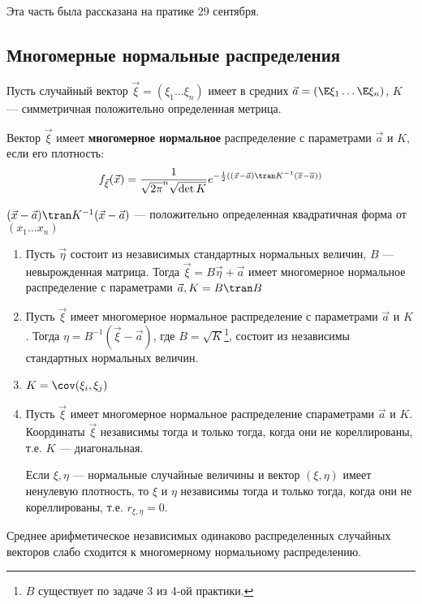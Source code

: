 \begin{remark}
    Эта часть была рассказана на пратике 29 сентября.
\end{remark}

\subsection{Многомерные нормальные распределения}

\begin{definition}
    Пусть случайный вектор \(\vec{\xi} = (\xi_1 \dots \xi_n)\) имеет в средних \(\vec{a} = (\E \xi_1 \dots \E \xi_n)\), \(K\) --- симметричная положительно определенная метрица.

    Вектор \(\vec{\xi}\) имеет \textbf{многомерное нормальное} распределение с параметрами \(\vec{a}\) и \(K\), если его плотность:
    \[f_{ \vec{\xi}}(\vec{x}) = \frac{1}{\sqrt{2 \pi}^n \sqrt{\det K}} e^{ - \frac{1}{2} ((\vec{x} - \vec{a})\tran K^{-1} (\overline{x} - \overline{a}))}\]
\end{definition}
\begin{remark}
    \((\vec{x} - \vec{a})\tran K^{-1} (\vec{x} - \vec{a})\) --- положительно определенная квадратичная форма от \((x_1 \dots x_n)\)
\end{remark}

\begin{prop}\itemfix
    \begin{enumerate}
        \item Пусть \(\vec{\eta}\) состоит из независимых стандартных нормальных величин, \(B\) --- невырожденная матрица. Тогда \(\vec{\xi} = B \vec{\eta} + \vec{a}\) имеет многомерное нормальное распределение с параметрами \(\vec{a}, K = B\tran B\)
        \item Пусть \(\vec{\xi}\) имеет многомерное нормальное распределение с параметрами \(\vec{a}\) и \(K\). Тогда \(\eta = B^{-1}(\vec{\xi} - \vec{a})\), где \(B = \sqrt{K}\)\footnote{\(B\) существует по задаче 3 из 4-ой практики.}, состоит из независимы стандартных нормальных величин.
        \item \(K = \cov(\xi_i, \xi_j)\)
        \item Пусть \(\vec{\xi}\) имеет многомерное нормальное распределение спараметрами \(\vec{a}\) и \(K\). Координаты \(\vec{\xi}\) независимы тогда и только тогда, когда они не кореллированы, т.е. \(K\) --- диагональная.

              \begin{corollary}
                  Если \(\xi, \eta\) --- нормальные случайные величины и вектор \((\xi, \eta)\) имеет ненулевую плотность, то \(\xi\) и \(\eta\) независимы тогда и только тогда, когда они не кореллированы, т.е. \(r_{\xi, \eta} = 0\).
              \end{corollary}
    \end{enumerate}
\end{prop}

\begin{theorem}
    Среднее арифметическое независимых одинаково распределенных случайных векторов слабо сходится к многомерному нормальному распределению.
\end{theorem}
